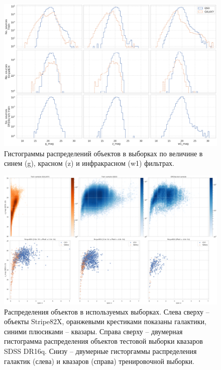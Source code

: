 \documentclass[fleqn,usenatbib]{mnras}
\begin{document}
\begin{figure}
    \centering
    \includegraphics[width=0.9\linewidth]{images/data-dist-mags.png}
    \caption{Гистограммы распределений объектов в выборках по величине в синем (g), красном (z) и инфракрасном (w1) фильтрах.}
    \label{fig:my_label}
\end{figure}

\begin{figure}
    \centering
    \includegraphics[width=0.95\linewidth]{images/data-dist.png}
    \caption{Распределения объектов в используемых выборках. Слева сверху -- объекты Stripe82X, оранжевыми крестиками показаны галактики, синими плюсиками -- квазары. Справа сверху -- двумерная гистограмма распределения объектов тестовой выборки квазаров SDSS DR16q. Снизу -- двумерные гисторгаммы распределения галактик (слева) и квазаров (справа) тренировочной выборки.}
    \label{fig:data_distribution}
\end{figure}

\end{document}
